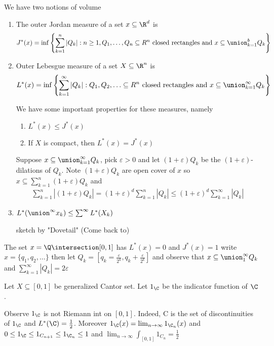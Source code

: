 We have two notions of volume
\begin{enumerate}
	\item The outer Jordan measure of a set $x \subseteq \R^d$ is
		\begin{align*}
			J^* (x)
      = \inf \left\{ \sum_{k=1}^{n} |Q_k| : n \geq 1, Q_1, \ldots, Q_n \subseteq R^n
      \text{ closed rectangles and }
			x \subseteq \union_{k=1}^{b} Q_k \right\}
		\end{align*}
	\item Outer Lebesgue measure of a set $X \subseteq \R^n$ is
		\begin{align*}
			L^*(x) = \inf \left\{ \sum_{k=1}^{\infty}|Q_k| : Q_1, Q_2, \ldots \subseteq R^n  \text{ closed rectangles and }
			x \subseteq \union_{k=1}^{\infty} Q_k \right\}
		\end{align*}

		We have some important properties for these measures, namely

		\begin{enumerate}
			\item $L^*(x) \leq J^* (x)$
			\item If  $X$ is compact, then $L^*(x) = J^*(x)$
		\end{enumerate}
		\begin{solution}
			Suppose $x \subseteq \union_{k=1}^{\infty} Q_k$, pick $\varepsilon > 0$ and let  $(1 + \varepsilon)Q_k$ be the $(1 + \varepsilon)$-dilations of $Q_k$. Note $(1+ \varepsilon ) Q_k$ are open cover of  $x$ so $x \subseteq \sum_{k=1}^n (1+\varepsilon) Q_k$ and
			\begin{align*}
				\sum_{k=1}^{n} |(1 + \varepsilon) Q_k| = (1+\varepsilon)^d \sum_{k=1}^{n}|Q_k| \leq (1 + \varepsilon)^d \sum_{k=1}^{\infty} | Q_k|
			\end{align*}
		\end{solution}

	\item $L^* (\union^{\infty} x_k ) \leq \sum_{}^{\infty} L^* (X_{k})$

		\begin{solution}
			sketch by "Dovetail" (Come back to)
		\end{solution}
\end{enumerate}

\begin{example}
	The set $x = \Q \intersection [0,1]$ has  $L^*(x) = 0$ and  $J^*(x) = 1$ write  $x = \{q_1, q_2, \ldots \}$ then let $Q_k = [q_k =  \frac{\varepsilon}{2^k}, q_k + \frac{\varepsilon}{2^k}]$
	and observe that $x \subseteq \union_{1}^{\infty} Q_k$ and $\sum_{k=1}^{\infty} |Q_k| = 2 \varepsilon$
\end{example}

\begin{example}
	Let $X \subseteq [0,1]$ be generalized Cantor set. Let $1_{\C}$ be the indicator function of $\C$.

	Observe $1_ {\C}$ is not Riemann int on $[0,1]$. Indeed, C is the set of discontinuities of $1_{\C}$ and $L^*(\C) = \frac{1}{2}$. Moreover $1_{\C}(x) = \lim_{n\to \infty} 1_{\C_n} (x)$ and
	$0 \leq 1_{\C} \leq 1_{C_{n+1}} \leq 1_{\C_{n}} \leq 1$ and
	$\lim_{n \to \infty} \int_{[0,1]} 1_{C_{n}} = \frac{1}{2} $
\end{example}
